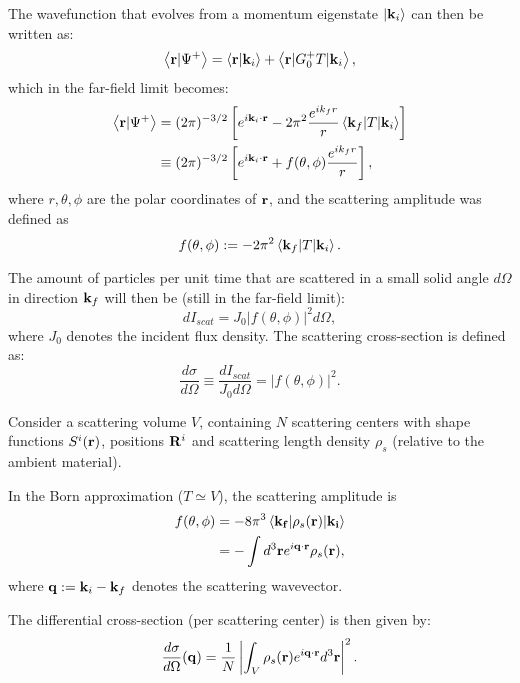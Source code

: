 The wavefunction that evolves from a momentum eigenstate $\vert \mathbf{k}_i \rangle$ can then be written as:
\begin{equation*}
  \left\langle \mathbf{r} \vert \Psi^+ \right\rangle = \left\langle \mathbf{r} \vert \mathbf{k}_i \right\rangle + \left\langle \mathbf{r} \vert G_0^+T \vert \mathbf{k}_i \right\rangle,
\end{equation*}
which in the far-field limit becomes:
\begin{align*}
  \left\langle \mathbf{r} \vert \Psi^+ \right\rangle
  &= (2\pi)^{-3/2}\left[ e^{i\mathbf{k}_i\cdot\mathbf{r}}
     - 2\pi^2\frac{e^{ik_f r}}{r} \left\langle \mathbf{k}_f \vert T \vert \mathbf{k}_i \right\rangle \right]  \\
  &\equiv (2\pi)^{-3/2}\left[ e^{i\mathbf{k}_i\cdot\mathbf{r}} + f(\theta,\phi)\frac{e^{ik_f r}}{r} \right],
\end{align*}
where $r,\theta,\phi$ are the polar coordinates of $\mathbf{r}$,
and the scattering amplitude was defined as
\begin{equation*}
  f(\theta, \phi) := -2\pi^2\left\langle \mathbf{k}_f \vert T \vert \mathbf{k}_i \right\rangle.
\end{equation*}

The amount of particles per unit time that are scattered in a small solid angle $d\Omega$ in direction $\mathbf{k}_f$ will then be (still in the far-field limit):
\begin{equation*}
  dI_{scat} = J_0\lvert f(\theta,\phi)\rvert^2d\Omega,
\end{equation*}
where $J_0$ denotes the incident flux density. The scattering cross-section is defined as:
\begin{equation*}
  \frac{d\sigma}{d\Omega}\equiv \frac{dI_{scat}}{J_0 d\Omega} = \lvert f(\theta,\phi) \rvert^2.
\end{equation*}

Consider a scattering volume $V$, containing $N$ scattering centers with shape functions $S^i(\mathbf{r})$, positions $\mathbf{R}^i$ and scattering length density $\rho_s$ (relative to the ambient material).

In the Born approximation ($T\simeq V$), the scattering amplitude is
\begin{align*}
  f(\theta, \phi) & = -8\pi^3 \left\langle \mathbf{k_f} \vert \rho_s(\mathbf{r}) \vert \mathbf{k_i} \right\rangle \nonumber \\
  & = -\int d^3\mathbf{r} e^{i\mathbf{q}\cdot\mathbf{r}} \rho_s(\mathbf{r}),
\end{align*}
where $\mathbf{q}:=\mathbf{k}_i-\mathbf{k}_f$ denotes the scattering wavevector.

The differential cross-section (per scattering center) is then given by:
\begin{equation}\label{eq:xsec1}
  \frac{d\sigma}{d\Omega}(\mathbf{q}) = \frac{1}{N}\left\lvert \int_V \rho_s(\mathbf{r}) e^{i\mathbf{q}\cdot\mathbf{r}} d^3\mathbf{r} \right\rvert ^2.
\end{equation}



